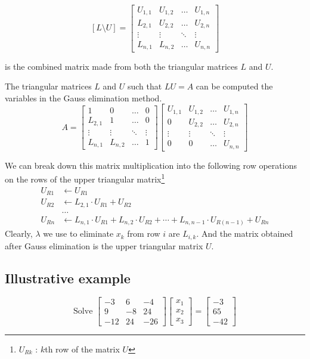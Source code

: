 	\[ [L\text{\textbackslash{}}U] = \begin{bmatrix} U_{1,1} & U_{1,2} & \dots & U_{1,n} \\ L_{2,1} & U_{2,2} & \dots & U_{2,n} \\ \vdots & \vdots & \ddots & \vdots \\  L_{n,1} & L_{n,2} & \dots & U_{n,n} \end{bmatrix} \]

	is the combined matrix made from both the triangular matrices $L$ and $U$.

	The triangular matrices $L$ and $U$ such that $LU = A$ can be computed the variables in the Gauss elimination method.
	\[ A = \begin{bmatrix} 1 & 0 & \dots & 0 \\ L_{2,1} & 1 & \dots & 0 \\ \vdots & \vdots & \ddots & \vdots \\ L_{n,1} & L_{n,2} & \dots & 1 \end{bmatrix} \begin{bmatrix} U_{1,1} & U_{1,2} & \dots & U_{1,n} \\ 0 & U_{2,2} & \dots & U_{2,n} \\ \vdots & \vdots & \ddots & \vdots \\ 0 & 0 & \dots & U_{n,n} \end{bmatrix} \]
	\begin{commentary}
		We can break down this matrix multiplication into the following row operations on the rows of the upper triangular matrix\footnote{$U_{Rk}$ : $k$th row of the matrix $U$}
	\begin{align*}
		U_{R1} & \leftarrow U_{R1} \\
		U_{R2} & \leftarrow L_{2,1}\cdot{}U_{R1} + U_{R2} \\
		& \dots \\
		U_{Rn} & \leftarrow L_{n,1}\cdot{}U_{R1} + L_{n,2}\cdot{}U_{R2} + \dotsb + L_{n,n-1}\cdot{}U_{R(n-1)} + U_{Rn}
	\end{align*}
	Clearly, $\lambda$ we use to eliminate $x_k$ from row $i$ are $L_{i,k}$.
		And the matrix obtained after Gauss elimination is the upper triangular matrix $U$.
	\end{commentary}
\subsection{Illustrative example}
	\[ \text{Solve } \begin{bmatrix} -3 & 6 & -4 \\ 9 & -8 & 24 \\ -12 & 24 & -26 \end{bmatrix} \begin{bmatrix} x_1 \\ x_2 \\ x_3 \end{bmatrix} = \begin{bmatrix} -3 \\ 65 \\ -42 \end{bmatrix} \]
